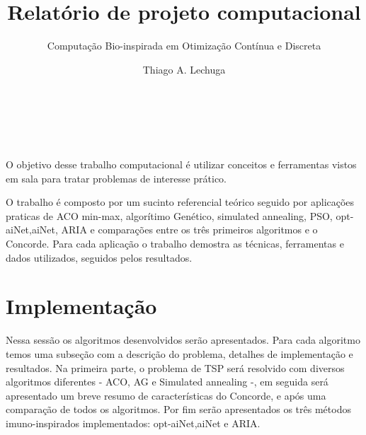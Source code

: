 \documentclass{acm_proc_article-sp}
\begin{document}
\title{Relatório de projeto computacional}
\subtitle{Computação Bio-inspirada em Otimização Contínua e Discreta}


\author{
%
%
\alignauthor
Thiago A. Lechuga\\
    \\
         \\
       \\
}

\maketitle

\begin{resumo}
O objetivo desse trabalho computacional é utilizar conceitos e ferramentas vistos em sala para tratar problemas de interesse prático.

O trabalho é composto por um sucinto referencial teórico seguido por aplicações praticas de ACO min-max, algorítimo Genético, simulated annealing, PSO, opt-aiNet,aiNet, ARIA e comparações entre os três primeiros algoritmos e o Concorde. Para cada aplicação o trabalho demostra as técnicas, ferramentas e dados utilizados, seguidos pelos resultados.
\end{resumo}


\section{Implementação}
Nessa sessão os algoritmos desenvolvidos serão apresentados. Para cada algoritmo temos uma subseção com a descrição do problema, detalhes de implementação e resultados.
Na primeira parte, o problema de TSP será resolvido com diversos algoritmos diferentes - ACO, AG e Simulated annealing -, em seguida será apresentado um breve resumo de características do Concorde, e após uma comparação de todos os algoritmos. Por fim serão apresentados os três métodos imuno-inspirados implementados: opt-aiNet,aiNet e ARIA.
\end{document}
